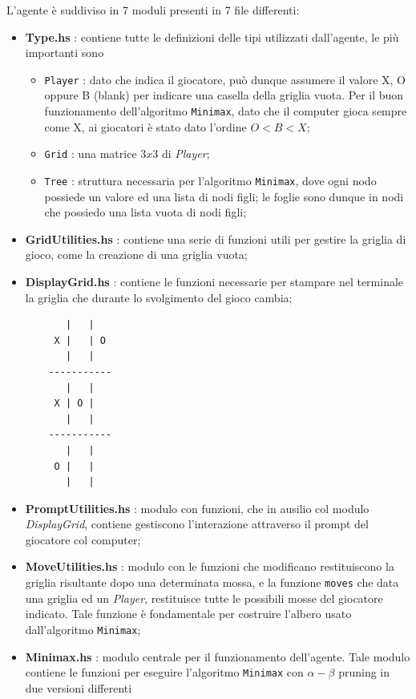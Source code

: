\documentclass[11pt, a4paper]{article}
\begin{document}
L'agente è suddiviso in 7 moduli presenti in 7 file differenti:
\begin{itemize}
	\item \textbf{Type.hs} : contiene tutte le definizioni delle tipi utilizzati dall'agente, le più importanti sono
	\begin{itemize}
		\item \texttt{Player} : dato che indica il giocatore, può dunque assumere il valore X, O oppure B (blank) per indicare una casella della griglia vuota. Per il buon funzionamento dell'algoritmo \texttt{Minimax}, dato che il computer gioca sempre come X, ai giocatori è stato dato l'ordine $O<B<X$;
		\item \texttt{Grid} : una matrice $3x3$ di \textit{Player};
		\item \texttt{Tree} : struttura necessaria per l'algoritmo \texttt{Minimax}, dove ogni nodo possiede un valore ed una lista di nodi figli; le foglie sono dunque in nodi che possiedo una lista vuota di nodi figli;
	\end{itemize}
	\item \textbf{GridUtilities.hs} : contiene una serie di funzioni utili per gestire la griglia di gioco, come la creazione di una griglia vuota;
	\item \textbf{DisplayGrid.hs} : contiene le funzioni necessarie per stampare nel terminale la griglia che durante lo svolgimento del gioco cambia;
	\begin{lstlisting}
	   |   |   
	 X |   | O
	   |   |
	-----------
	   |   |   
	 X | O | 
	   |   |
	-----------
	   |   |   
	 O |   | 
	   |   |
	\end{lstlisting}
	\item \textbf{PromptUtilities.hs} : modulo con funzioni, che in ausilio col modulo \textit{DisplayGrid}, contiene gestiscono l'interazione attraverso il prompt del giocatore col computer;
	\item \textbf{MoveUtilities.hs} : modulo con le funzioni che modificano restituiscono la griglia risultante dopo una determinata mossa, e la funzione \texttt{moves} che data una griglia ed un \textit{Player}, restituisce tutte le possibili mosse del giocatore indicato. Tale funzione è fondamentale per costruire l'albero usato dall'algoritmo \texttt{Minimax};
	\item \textbf{Minimax.hs} : modulo centrale per il funzionamento dell'agente. Tale modulo contiene le funzioni per eseguire l'algoritmo \texttt{Minimax} con $\alpha-\beta$ pruning in due versioni differenti
	\begin{itemize}

\end{itemize}
\end{itemize}
\end{document}
